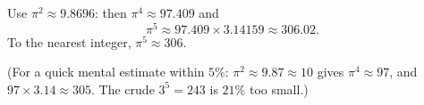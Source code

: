 Use $\pi^2\approx9.8696$: then $\pi^4\approx97.409$ and
\[
\pi^5\approx97.409\times3.14159\approx306.02 .
\]
To the nearest integer, $\pi^5\approx\boxed{306}$.

(For a quick mental estimate within $5\%$: $\pi^2\approx9.87\approx10$ gives $\pi^4\approx97$, and $97\times3.14\approx305$. The crude $3^5=243$ is $21\%$ too small.)
